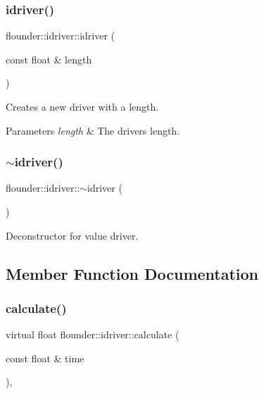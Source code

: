 \subsubsection{\texorpdfstring{idriver()}{idriver()}}
{\footnotesize\ttfamily flounder\+::idriver\+::idriver (\begin{DoxyParamCaption}\item[{const float \&}]{length }\end{DoxyParamCaption})\hspace{0.3cm}{\ttfamily [inline]}}



Creates a new driver with a length. 


\begin{DoxyParams}{Parameters}
{\em length} & The drivers length. \\
\hline
\end{DoxyParams}
\mbox{\label{classflounder_1_1idriver_a873c8a53f058e3df6467bfec55dc3ae2}} 
\subsubsection{\texorpdfstring{$\sim$idriver()}{~idriver()}}
{\footnotesize\ttfamily flounder\+::idriver\+::$\sim$idriver (\begin{DoxyParamCaption}{ }\end{DoxyParamCaption})\hspace{0.3cm}{\ttfamily [inline]}}



Deconstructor for value driver. 



\subsection{Member Function Documentation}
\mbox{\label{classflounder_1_1idriver_a034c4159dc98c4c37ffdfaae64e4a16d}} 
\subsubsection{\texorpdfstring{calculate()}{calculate()}}
{\footnotesize\ttfamily virtual float flounder\+::idriver\+::calculate (\begin{DoxyParamCaption}\item[{const float \&}]{time }\end{DoxyParamCaption})\hspace{0.3cm}{\ttfamily [protected]}, {}}



